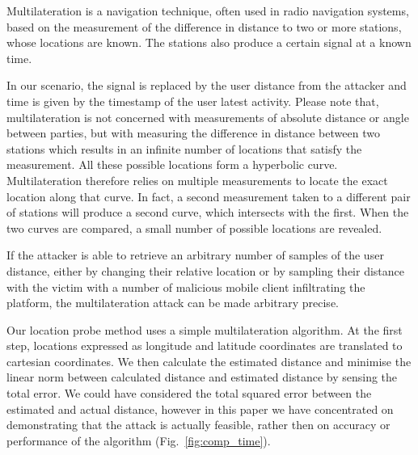 Multilateration is a navigation technique, often used in radio navigation systems, based on the measurement of the difference in distance to two or more stations, whose locations are known. The stations also produce a certain signal at a known time.\

In our scenario, the signal is replaced by the user distance from the attacker and time is given by the timestamp of the user latest activity. Please note that, multilateration is not concerned with measurements of absolute distance or angle between parties, but with measuring the difference in distance between two stations which results in an infinite number of locations that satisfy the measurement. All these possible locations form a hyperbolic curve. Multilateration therefore relies on multiple measurements to locate the exact location along that curve. In fact, a second measurement taken to a different pair of stations will produce a second curve, which intersects with the first. When the two curves are compared, a small number of possible locations are revealed.

If the attacker is able to retrieve an arbitrary number of samples of the user distance, either by changing their relative location or by sampling their distance with the victim with a number of malicious mobile client infiltrating the platform, the multilateration attack can be made arbitrary precise.

Our location probe method uses a simple multilateration algorithm. At the first step, locations expressed as longitude and latitude coordinates are translated to cartesian coordinates. We then calculate the estimated distance and minimise the linear norm between calculated distance and estimated distance by sensing the total error. We could have considered the total squared error between the estimated and actual distance, however in this paper we have concentrated on demonstrating that the attack is actually feasible, rather then on accuracy or performance of the algorithm (Fig.~\ref{fig:comp_time}).

